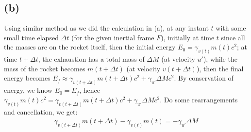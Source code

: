 \documentclass{article}
\begin{document}
\subsection*{(b)}
Using similar method as we did the calculation in (a), at any instant $t$ with some small time elapsed $\Delta t$ (for the given inertial frame $F$), initially at time $t$ since all the masses are on the rocket itself, then the initial energy $E_0 = \gamma_{v(t)} m(t)c^2$; at time $t+\Delta t$, the exhaustion has a total mass of $\Delta M$ (at velocity $u'$), while the mass of the rocket becomes $m(t+\Delta t)$ (at velocity $v(t+\Delta t)$), then the final energy becomes $E_f \approx \gamma_{v(t+\Delta t)}m(t+\Delta t)c^2 + \gamma_{u'}\Delta M c^2$. By conservation of energy, we know $E_0 = E_f$, hence $\gamma_{v(t)}m(t)c^2 = \gamma_{v(t+\Delta t)}m(t+\Delta t)c^2 + \gamma_{u'}\Delta M c^2$. Do some rearrangements and cancellation, we get:
\begin{align}
    \gamma_{v(t+\Delta t)}m(t+\Delta t) - \gamma_{v(t)}m(t) = -\gamma_{u'}\Delta M
\end{align}
\end{document}
